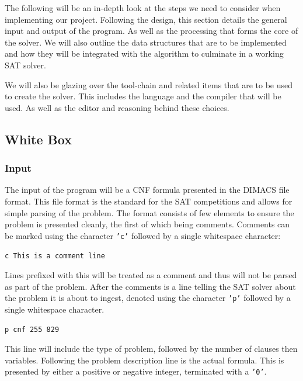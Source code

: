 \documentclass{article}
\begin{document}
The following will be an in-depth look at the steps we need to consider when implementing our
project. Following the design, this section details the general input and output of the program. As
well as the processing that forms the core of the solver. We will also outline the data structures
that are to be implemented and how they will be integrated with the algorithm to culminate in a
working SAT solver.

We will also be glazing over the tool-chain and related items that are to be used to create the
solver. This includes the language and the compiler that will be used. As well as the editor and
reasoning behind these choices.

\subsection{White Box}
\subsubsection{Input}
The input of the program will be a CNF formula presented in the DIMACS file format. This file format
is the standard for the SAT competitions and allows for simple parsing of the problem. The format
consists of few elements to ensure the problem is presented cleanly, the first of which being
comments. Comments can be marked using the character \texttt{'c'} followed by a single whitespace
character:

\begin{center}
    \texttt{c This is a comment line}
\end{center}

Lines prefixed with this will be treated as a
comment and thus will not be parsed as part of the problem. After the comments is a line telling the
SAT solver about the problem it is about to ingest, denoted using the character \texttt{'p'}
followed by a single whitespace character.

\begin{center}
    \texttt{p cnf 255 829}
\end{center}

This line will include the type of problem, followed by the number of clauses then
variables. Following the problem description line is the actual formula. This is presented by either
a positive or negative integer, terminated with a \texttt{'0'}.
\end{document}
